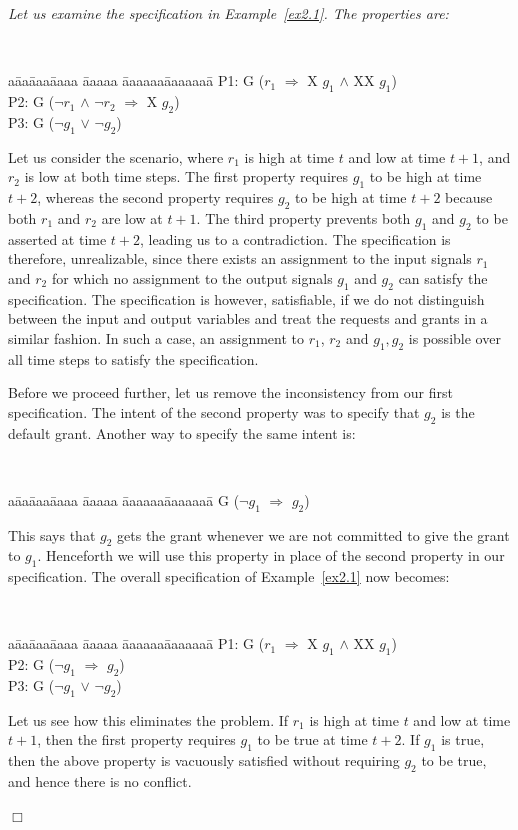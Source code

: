 \begin{example} \label{ex2.2}
{\em Let us examine the specification in Example~\ref{ex2.1}. The properties 
are:
{\tt
\begin{tabbing}
a\= aa\= aaa\= aaaa \= aaaaa \= aaaaaa\= aaaaaaa\= \kill
\>\>\>\>\>\> P1: G ($r_1$ $\Rightarrow$  X $g_1$ $\land$  XX $g_1$) \\
\>\>\>\> \>\>P2: G ($\neg r_1$ $\land$ $\neg r_2$ $\Rightarrow$  X $g_2$) \\
\>\>\>\> \>\>P3: G ($\neg g_1$ $\lor$ $\neg g_2$)
\end{tabbing}
}
\noindent
Let us consider the scenario, where $r_1$ is high at time $t$ and low at time
$t+1$, and $r_2$ is low at both time steps. The first property requires
$g_1$ to be high at time $t+2$, whereas the second property requires
$g_2$ to be high at time $t+2$ because both $r_1$ and $r_2$ are low at
$t+1$. The third property prevents both $g_1$ and $g_2$ to be asserted at
time $t+2$, leading us to a contradiction. The specification is therefore,
unrealizable, since there exists an assignment to the input signals
$r_1$ and $r_2$ for which no assignment to the output signals $g_1$ and
$g_2$ can satisfy the specification. The specification is however,
satisfiable, if we do not distinguish between the input and output
variables and treat the requests and grants in a similar fashion. In such
a case, an assignment to $r_1$, $r_2$ and $g_1, g_2$ is possible over
all time steps to satisfy the specification. 

\noindent
Before we proceed further, let us remove the inconsistency from our first
specification. The intent of the second property was to specify that $g_2$
is the default grant. Another way to specify the same intent is:
{\tt
\begin{tabbing}
a\= aa\= aaa\= aaaa \= aaaaa \= aaaaaa\= aaaaaaa\= \kill
\>\>\>\>\>\>\> G ($\neg g_1$ $\Rightarrow$  $g_2$)
\end{tabbing}
}
\noindent
This says that $g_2$ gets the grant whenever we are not committed to give the
grant to $g_1$. Henceforth we will use this property in place of the second
property in our specification. The overall specification of Example~\ref{ex2.1}
now becomes:

{\tt
\begin{tabbing}
a\= aa\= aaa\= aaaa \= aaaaa \= aaaaaa\= aaaaaaa\= \kill
\>\>\>\>\>\> P1: G ($r_1$ $\Rightarrow$  X $g_1$ $\land$  XX $g_1$) \\
\>\>\>\>\>\> P2: G ($\neg g_1$ $\Rightarrow$  $g_2$) \\
\>\>\>\> \>\>P3: G ($\neg g_1$ $\lor$ $\neg g_2$)
\end{tabbing}
}

\noindent
Let us see how this eliminates the problem. If $r_1$ is high at time $t$ and
low at time $t+1$, then the first property requires $g_1$ to be true at time
$t+2$. If $g_1$ is true, then the above property is vacuously satisfied
without requiring $g_2$ to be true, and hence there is no conflict.
} $\Box$
\end{example}

